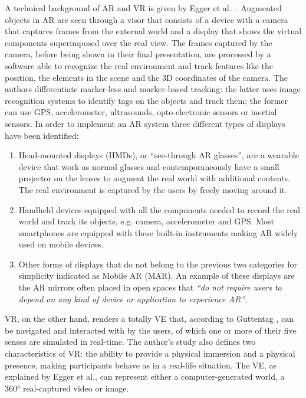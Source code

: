 A technical background of AR and VR is given by Egger et al.~\cite{egger_augmented_2020}. Augmented objects in AR are seen through a visor that consists of a device with a camera that captures frames from the external world and a display that shows the virtual components superimposed over the real view. The frames captured by the camera, before being shown in their final presentation, are processed by a software able to recognize the real environment and track features like the position, the elements in the scene and the 3D coordinates of the camera.
The authors differentiate marker-less and marker-based tracking: the latter uses image recognition systems to identify tags on the objects and track them; the former can use GPS, accelerometer, ultrasounds, opto-electronic sensors or inertial sensors.
In order to implement an AR system three different types of displays have been identified:
\begin{enumerate}
	\item Head-mounted displays (HMDs), or “see-through AR glasses”, are a wearable device that work as normal glasses and contemporaneously have a small projector on the lenses to augment the real world with additional contents. The real environment is captured by the users by freely moving around it.
	\item Handheld devices equipped with all the components needed to record the real world and track its objects, e.g. camera, accelerometer and GPS. Most smartphones are equipped with these built-in instruments making AR widely used on mobile devices.
	\item Other forms of displays that do not belong to the previous two categories for simplicity indicated as Mobile AR (MAR). An example of these displays are the AR mirrors often placed in open spaces that \textit{“do not require users to depend on any kind of device or application to experience AR”}.
\end{enumerate} 
VR, on the other hand, renders a totally VE that, according to Guttentag \cite{guttentag_virtual_2020}, can be navigated and interacted with by the users, of which one or more of their five senses are simulated in real-time. The author's study also defines two characteristics of VR: the ability to provide a physical immersion and a physical presence, making participants behave as in a real-life situation.
The VE, as explained by Egger et al., can represent either a computer-generated world, a 360° real-captured video or image.

